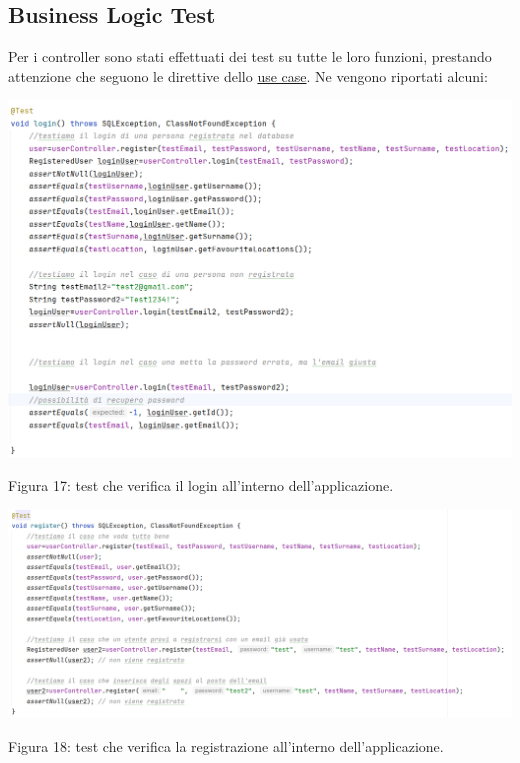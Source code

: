 \documentclass[10pt]{article}
\begin{document}
\subsection{Business Logic Test}

Per i controller sono stati effettuati dei test su tutte le loro funzioni, prestando attenzione che seguono le direttive dello \hyperref[usecase]{use case}. Ne vengono riportati alcuni:

\begin{center}
\hspace*{-0.75cm}
\includegraphics[scale=0.55]{test/BusinessLogic/login}
\par\medskip
Figura 17: test che verifica il login all'interno dell'applicazione.
\par\medskip
\end{center}

\begin{center}
\hspace*{-2cm}
\includegraphics[scale=0.55]{test/BusinessLogic/register}
\par\medskip
Figura 18: test che verifica la registrazione all'interno dell'applicazione.
\par\medskip
\end{center}
\end{document}
